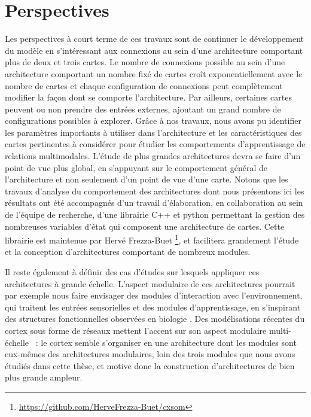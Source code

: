 \section*{Perspectives}

Les perspectives à court terme de ces travaux sont de continuer le développement du modèle en s'intéressant aux connexions au sein d'une architecture comportant plus de deux et trois cartes.
Le nombre de connexions possible au sein d'une architecture comportant un nombre fixé de cartes croît exponentiellement avec le nombre de cartes et chaque configuration de connexions peut complètement modifier la façon dont se comporte l'architecture. Par ailleurs, certaines cartes peuvent ou non prendre des entrées externes, ajoutant un grand nombre de configurations possibles à explorer.
Grâce à nos travaux, nous avons pu identifier les paramètres importants à utiliser dans l'architecture et les caractéristiques des cartes pertinentes à considérer pour étudier les comportements d'apprentissage de relations multimodales. L'étude de plus grandes architectures devra se faire d'un point de vue plus global, en s'appuyant sur le comportement général de l'architecture et non seulement d'un point de vue d'une carte. Notons que les travaux d'analyse du comportement des architectures dont nous présentons ici les résultats ont été accompagnés d'un travail d'élaboration, en collaboration au sein de l'équipe de recherche, d'une librairie C++ et python permettant la gestion des nombreuses variables d'état qui composent une architecture de cartes. Cette librairie est maintenue par Hervé Frezza-Buet \footnote{\url{https://github.com/HerveFrezza-Buet/cxsom}}, et facilitera grandement l'étude et la conception d'architectures comportant de nombreux modules.

Il reste également à définir des cas d'études sur lesquels appliquer ces architectures à grande échelle.
L'aspect modulaire de ces architectures pourrait par exemple nous faire envisager des modules d'interaction avec l'environnement, qui traitent les entrées sensorielles et des modules d'apprentissage, en s'inspirant des structures fonctionnelles observées en biologie \parencite{Ellefsen2015NeuralMH}. 
Des modélisations récentes du cortex sous forme de réseaux mettent l'accent sur son aspect modulaire multi-échelle \parencite{betzel_multi-scale_2017}~: le cortex semble s'organiser en une architecture dont les modules sont eux-mêmes des architectures modulaires, loin des trois modules que nous avons étudiés dans cette thèse, et motive donc la construction d'architectures de bien plus grande ampleur.

